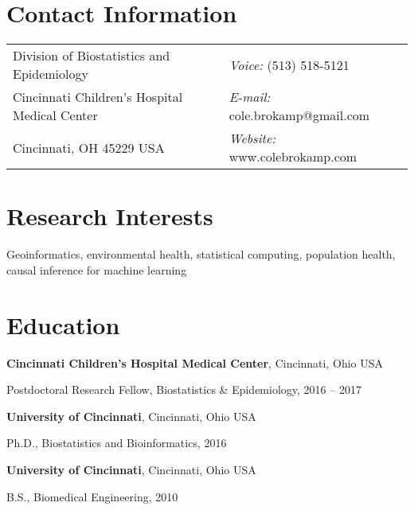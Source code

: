 \documentclass[margin,line]{res}
\newenvironment{list1}{
  \begin{list}{\ding{113}}{%
      \setlength{\itemsep}{0in}
      \setlength{\parsep}{0in} \setlength{\parskip}{0in}
      \setlength{\topsep}{0in} \setlength{\partopsep}{0in}
      \setlength{\leftmargin}{0.17in}}}{\end{list}}
\begin{document}

\begin{resume}
\section{\sc Contact Information}
\vspace{.05in}
\begin{tabular}{@{}p{3in}p{4in}}
Division of Biostatistics and Epidemiology & {\it Voice:}  (513) 518-5121 \\
Cincinnati Children's Hospital Medical Center & {\it E-mail:}  cole.brokamp@gmail.com\\
Cincinnati, OH 45229 USA  & {\it Website:} www.colebrokamp.com \\
\end{tabular}


\section{\sc Research Interests}
Geoinformatics, environmental health, statistical computing, population health,
causal inference for machine learning

\section{\sc Education}

{\bf Cincinnati Children's Hospital Medical Center}, Cincinnati, Ohio USA \\
\vspace*{-.1in}
\begin{list1}
\item[]Postdoctoral Research Fellow, Biostatistics \& Epidemiology, 2016 -- 2017
\end{list1}

{\bf University of Cincinnati}, Cincinnati, Ohio USA \\
\vspace*{-.1in}
\begin{list1}
\item[]Ph.D., Biostatistics and Bioinformatics, 2016
\end{list1}

{\bf University of Cincinnati}, Cincinnati, Ohio USA\\
\vspace*{-.1in}
\begin{list1}
\item[]B.S., Biomedical Engineering, 2010
\end{list1}



\end{resume}
\end{document}
